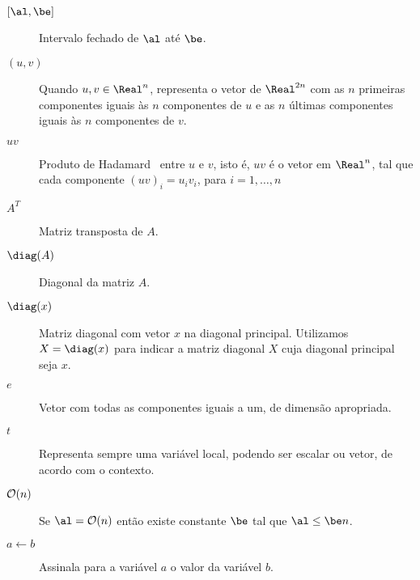 \begin{description}
    \item[{$[\al, \be]$}] Intervalo fechado de $\al$ até $\be$.

    \item[$(u,v)$] Quando $u, v\in\Real^n$, representa o vetor de $\Real^{2n}$ com as $n$ primeiras componentes iguais às $n$ componentes de  $u$ e  as $n$ últimas componentes iguais às $n$ componentes de $v$.

    \item[$uv$]  Produto de Hadamard~\cite[p.~455]{Horn:1985tf} entre $u$ e $v$, 
isto é, $uv$ é o vetor em $\Real^n$, tal que cada componente  $(uv)_i  = u_iv_i$, para $i=1,\ldots,n$

    \item[$A^T$] Matriz transposta de $A$.

    \item[$\diag(A)$] Diagonal da matriz $A$. 

    \item[$\diag(x)$] Matriz diagonal com vetor $x$ na diagonal principal. Utilizamos $X = \diag(x)$ para indicar a matriz diagonal $X$ cuja diagonal principal seja $x$.
 
    \item[$e$] Vetor com todas as componentes iguais a um, de dimensão apropriada.

    \item[$t$] Representa sempre uma variável local, podendo ser escalar ou vetor, de acordo com o contexto.


    \item[$\mathcal{O}(n)$] Se $\al = \Oset(n)$ então existe constante $\be$ tal que $\al \leq \be n$.

    \item[$a\leftarrow b$] Assinala para a variável $a$ o valor da variável $b$.

\end{description}
